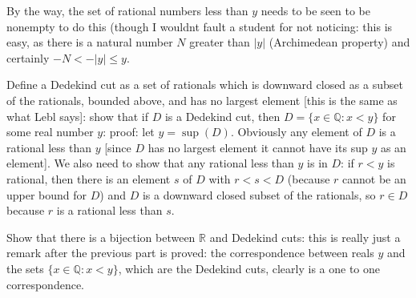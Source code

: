 \documentclass[12pt]{article}
\begin{document}
\begin{description}
By the way, the set of rational numbers less than $y$ needs to be seen to be nonempty to do this (though I wouldnt fault a student for not noticing:
this is easy, as there is a natural number $N$ greater than $|y|$ (Archimedean property) and certainly $-N<-|y| \leq y$.

Define a Dedekind cut as a set of rationals which is downward closed as a subset of the rationals, bounded above, and has no largest element [this is the same as what Lebl says]:
show that if $D$ is a Dedekind cut, then $D = \{x \in \mathbb Q:x<y\}$ for some real number $y$:  proof:  let $y = \sup(D)$.  Obviously
any element of $D$ is a rational less than $y$ [since $D$ has no largest element it cannot have its sup $y$ as an element].  We also need to show that any rational less than $y$ is in $D$:  if $r<y$ is rational, then there is an element $s$ of $D$ with $r<s<D$ (because $r$ cannot be an upper bound for $D$) and
$D$ is a downward closed subset of the rationals, so $r \in D$ because $r$ is a rational less than $s$.

Show that there is a bijection between $\mathbb R$ and Dedekind cuts:  this is really just a remark after the previous part is proved:  the correspondence between
reals $y$ and the sets $\{x \in \mathbb Q:x<y\}$, which are the Dedekind cuts, clearly is a one to one correspondence.

\end{description}
\end{document}
